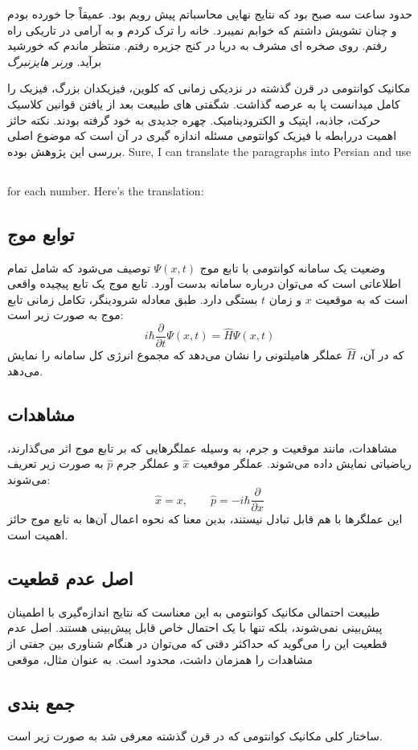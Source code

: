 \begin{qt}
     حدود ساعت سه صبح بود که نتایج نهایی محاسباتم پیش رویم بود. عمیقاً جا خورده بودم و چنان تشویش داشتم که خوابم نمیبرد. خانه را ترک کردم و به آرامی در تاریکی راه رفتم. روی صخره ای مشرف به دریا در کنج جزیره رفتم. منتظر ماندم که خورشید برآید. \textit{ورنر هایزنبرگ}
\end{qt}
مکانیک کوانتومی در قرن گذشته در نزدیکی زمانی که کلوین، فیزیکدان بزرگ، فیزیک را کامل میدانست پا به عرصه گذاشت. شگفتی های طبیعت بعد از یافتن قوانین کلاسیک حرکت، جاذبه، اپتیک و الکترودینامیک. چهره جدیدی به خود گرفته بودند. نکته حائز اهمیت دررابطه با فیزیک کوانتومی مسئله اندازه گیری در آن است که موضوع اصلی بررسی این پژوهش بوده.
Sure, I can translate the paragraphs into Persian and use \subsection{} for each number. Here's the translation:

\subsection{توابع موج}
وضعیت یک سامانه کوانتومی با تابع موج $\Psi(x,t)$ توصیف می‌شود که شامل تمام اطلاعاتی است که می‌توان درباره سامانه بدست آورد. تابع موج یک تابع پیچیده واقعی است که به موقعیت $x$ و زمان $t$ بستگی دارد. طبق معادله شرودینگر، تکامل زمانی تابع موج به صورت زیر است:
\begin{equation}
i\hbar\frac{\partial}{\partial t}\Psi(x,t) = \hat{H}\Psi(x,t)
\end{equation}
که در آن، $\hat{H}$ عملگر هامیلتونی را نشان می‌دهد که مجموع انرژی کل سامانه را نمایش می‌دهد.

\subsection{مشاهدات}
مشاهدات، مانند موقعیت و جرم، به وسیله عملگرهایی که بر تابع موج اثر می‌گذارند، ریاضیاتی نمایش داده می‌شوند. عملگر موقعیت $\hat{x}$ و عملگر جرم $\hat{p}$ به صورت زیر تعریف می‌شوند:
\begin{equation}
\hat{x} = x,\qquad \hat{p} = -i\hbar\frac{\partial}{\partial x}
\end{equation}
این عملگرها با هم قابل تبادل نیستند، بدین معنا که نحوه اعمال آن‌ها به تابع موج حائز اهمیت است.

\subsection{اصل عدم قطعیت}
طبیعت احتمالی مکانیک کوانتومی به این معناست که نتایج اندازه‌گیری با اطمینان پیش‌بینی نمی‌شوند، بلکه تنها با یک احتمال خاص قابل پیش‌بینی هستند. اصل عدم قطعیت این را می‌گوید که حداکثر دقتی که می‌توان در هنگام شناوری بین جفتی از مشاهدات را همزمان داشت، محدود است. به عنوان مثال، موقعی

\subsection{جمع بندی}
ساختار کلی مکانیک کوانتومی که در قرن گذشته معرفی شد به صورت زیر است.
